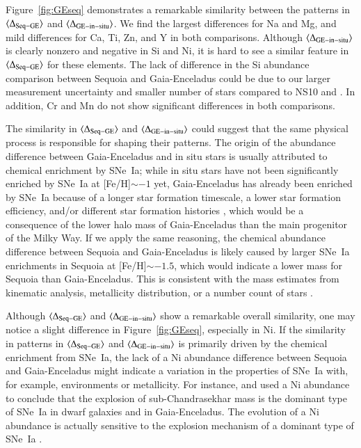 \documentclass{aa}
\begin{document}
Figure~\ref{fig:GEseq} demonstrates a remarkable similarity between the patterns in $\langle\Delta_{\rm Seq-GE}\rangle$ and $\langle\Delta_{\rm GE-in-situ}\rangle$. 
We find the largest differences for Na and Mg, and mild differences for Ca, Ti, Zn, and Y in both comparisons.
Although $\langle\Delta_{\rm GE-in-situ}\rangle$ is clearly nonzero and negative in Si and Ni, it is hard to see a similar feature in $\langle\Delta_{\rm Seq-GE}\rangle$ for these elements.  
The lack of difference in the Si abundance comparison between Sequoia and Gaia-Enceladus could be due to our larger measurement uncertainty and smaller number of stars compared to NS10 and \citet{Nissen2011}.
In addition, Cr and Mn do not show significant differences in both comparisons.

The similarity in $\langle \Delta_{\rm Seq-GE} \rangle$ and $\langle \Delta_{\rm GE-in-situ}\rangle$ could suggest that the same physical process is responsible for shaping their patterns.
The origin of the abundance difference between Gaia-Enceladus and in situ stars is usually attributed to chemical enrichment by SNe~Ia;
while in situ stars have not been significantly enriched by SNe~Ia at [{Fe}/{H}]$\sim -1$ yet, Gaia-Enceladus has already been enriched by SNe~Ia because of a longer star formation timescale, a lower star formation efficiency, and/or different star formation histories \citep[e.g.,][]{Zolotov2010,Nissen2010,Nissen2011,FernandezAlvar2018a,Gallart2019a,Brook2020a,Sanders2021a}, which would be a consequence of the lower halo mass of Gaia-Enceladus than the main progenitor of the Milky Way.
If we apply the same reasoning, the chemical abundance difference between Sequoia and Gaia-Enceladus is likely caused by larger SNe~Ia enrichments in Sequoia at [{Fe}/{H}]$\sim -1.5$, which would indicate a lower mass for Sequoia than Gaia-Enceladus.
This is consistent with the mass estimates from kinematic analysis, metallicity distribution, or a number count of stars \citep{Koppelman2019a,Myeong2019a,Matsuno2019a,Naidu2020a}.

Although $\langle \Delta_{\rm Seq-GE} \rangle$ and $\langle \Delta_{\rm GE-in-situ}\rangle $ show a remarkable overall similarity, one may notice a slight difference in Figure~\ref{fig:GEseq}, especially in Ni.
If the similarity in patterns in $\langle \Delta_{\rm Seq-GE} \rangle$ and $\langle \Delta_{\rm GE-in-situ}\rangle $ is primarily driven by the chemical enrichment from SNe~Ia, the lack of a Ni abundance difference between Sequoia and Gaia-Enceladus might indicate a variation in the properties of SNe~Ia with, for example, environments or metallicity.
For instance, \citet{Kirby2019a} and \citet{Sanders2021a} used a Ni abundance to conclude that the explosion of sub-Chandrasekhar mass is the dominant type of SNe~Ia in dwarf galaxies and in Gaia-Enceladus.
The evolution of a Ni abundance is actually sensitive to the explosion mechanism of a dominant type of SNe~Ia \citep{Palla2021a}.
\end{document}
